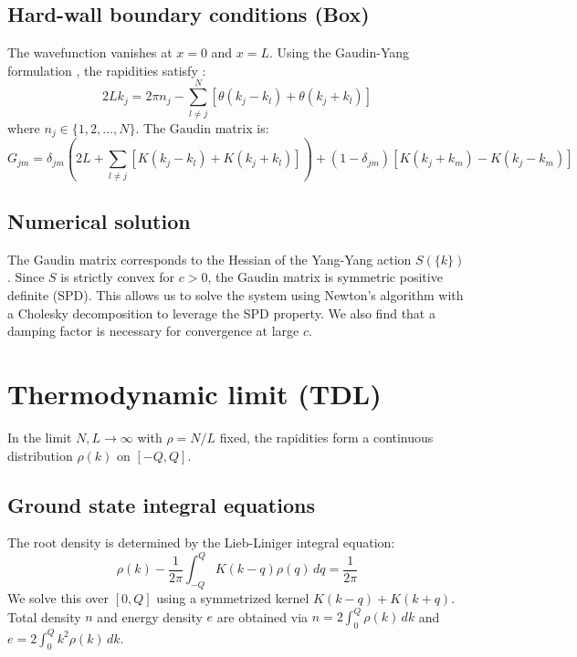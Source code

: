 \documentclass[11pt]{article}
\begin{document}
\subsection{Hard-wall boundary conditions (Box)}
The wavefunction vanishes at $x=0$ and $x=L$. Using the Gaudin-Yang formulation \cite{guan2005}, the rapidities satisfy \cite{Batchelor_2005}:
\begin{equation}
    2Lk_j = 2\pi n_j - \sum_{l \neq j}^N \left[ \theta(k_j - k_l) + \theta(k_j + k_l) \right]
\end{equation}
where $n_j \in \{1, 2, \dots, N\}$. The Gaudin matrix is:
\begin{equation}
    G_{jm} = \delta_{jm} \left( 2L + \sum_{l \neq j} [K(k_j - k_l) + K(k_j + k_l)] \right) + (1 - \delta_{jm}) [K(k_j + k_m) - K(k_j - k_m)]
\end{equation}

\subsection{Numerical solution}
The Gaudin matrix corresponds to the Hessian of the Yang-Yang action $S(\{k\})$. Since $S$ is strictly convex for $c > 0$, the Gaudin matrix is symmetric positive definite (SPD). This allows us to solve the system using Newton's algorithm with a Cholesky decomposition to leverage the SPD property. We also find that a damping factor is necessary for convergence at large $c$.

\section{Thermodynamic limit (TDL)}
In the limit $N, L \to \infty$ with $\rho = N/L$ fixed, the rapidities form a continuous distribution $\rho(k)$ on $[-Q, Q]$\cite{zvonarev2010}.

\subsection{Ground state integral equations}
The root density is determined by the Lieb-Liniger integral equation:
\begin{equation}
    \rho(k) - \frac{1}{2\pi} \int_{-Q}^{Q} K(k - q) \rho(q) \, dq = \frac{1}{2\pi}
\end{equation}
We solve this over $[0, Q]$ using a symmetrized kernel $K(k-q) + K(k+q)$. Total density $n$ and energy density $e$ are obtained via $n = 2 \int_0^Q \rho(k) \, dk$ and $e = 2 \int_0^Q k^2 \rho(k) \, dk$.
\end{document}
